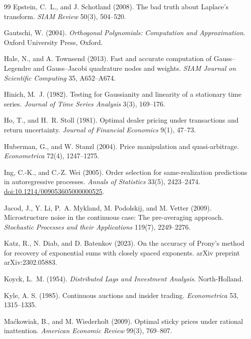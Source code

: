 \documentclass[12pt]{article}
\theoremstyle{definition}
\theoremstyle{remark}
\begin{document}
\begin{thebibliography}{99}
 Epstein, C.~L., and J. Schotland (2008). The bad truth about Laplace's transform. \emph{SIAM Review} 50(3), 504--520.

 Gautschi, W. (2004). \emph{Orthogonal Polynomials: Computation and Approximation}. Oxford University Press, Oxford.

 Hale, N., and A. Townsend (2013). Fast and accurate computation of Gauss--Legendre and Gauss--Jacobi quadrature nodes and weights. \emph{SIAM Journal on Scientific Computing} 35, A652--A674.

 Hinich, M.~J. (1982). Testing for Gaussianity and linearity of a stationary time series. \emph{Journal of Time Series Analysis} 3(3), 169--176.

 Ho, T., and H.~R. Stoll (1981). Optimal dealer pricing under transactions and return uncertainty. \emph{Journal of Financial Economics} 9(1), 47--73.

 Huberman, G., and W. Stanzl (2004). Price manipulation and quasi-arbitrage. \emph{Econometrica} 72(4), 1247--1275.

 Ing, C.-K., and C.-Z. Wei (2005). Order selection for same-realization predictions in autoregressive processes. \emph{Annals of Statistics} 33(5), 2423--2474. \href{https://doi.org/10.1214/009053605000000525}{doi:10.1214/009053605000000525}.

 Jacod, J., Y. Li, P.~A. Mykland, M. Podolskij, and M. Vetter (2009). Microstructure noise in the continuous case: The pre-averaging approach. \emph{Stochastic Processes and their Applications} 119(7), 2249--2276.

 Katz, R., N. Diab, and D. Batenkov (2023). On the accuracy of Prony's method for recovery of exponential sums with closely spaced exponents. arXiv preprint arXiv:2302.05883.

 Koyck, L.~M. (1954). \emph{Distributed Lags and Investment Analysis}. North-Holland.

 Kyle, A. S. (1985). Continuous auctions and insider trading. \emph{Econometrica} 53, 1315--1335.

 Ma\'ckowiak, B., and M. Wiederholt (2009). Optimal sticky prices under rational inattention. \emph{American Economic Review} 99(3), 769--807.


\end{thebibliography}
\end{document}
